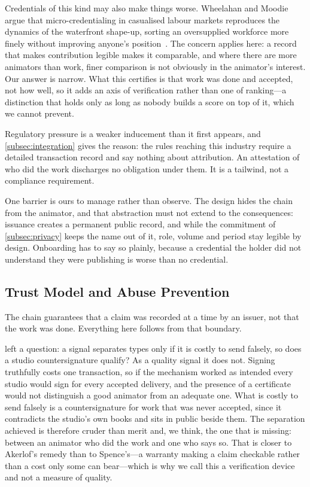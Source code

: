 Credentials of this kind may also make things worse. Wheelahan and Moodie argue that
micro-credentialing in casualised labour markets reproduces the dynamics of the
waterfront shape-up, sorting an oversupplied workforce more finely without improving
anyone's position~\cite{wheelahan2021gig}. The concern applies here: a record that makes
contribution legible makes it comparable, and where there are more animators than work,
finer comparison is not obviously in the animator's interest. Our answer is narrow. What
this certifies is that work was done and accepted, not how well, so it adds an axis of
verification rather than one of ranking---a distinction that holds only as long as
nobody builds a score on top of it, which we cannot prevent.

Regulatory pressure is a weaker inducement than it first appears, and
\cref{subsec:integration} gives the reason: the rules reaching this industry require a
detailed transaction record and say nothing about attribution. An attestation of who
did the work discharges no obligation under them. It is a tailwind, not a compliance
requirement.

One barrier is ours to manage rather than observe. The design hides the chain from the
animator, and that abstraction must not extend to the consequences: issuance creates a
permanent public record, and while the commitment of \cref{subsec:privacy} keeps the name
out of it, role, volume and period stay legible by design. Onboarding has to say so
plainly, because a credential the holder did not understand they were publishing is worse
than no credential.

\subsection{Trust Model and Abuse Prevention}
\label{subsec:trust}

The chain guarantees that a claim was recorded at a time by an issuer, not that the
work was done. Everything here follows from that boundary.

 left a question: a signal separates types only if it is costly to
send falsely, so does a studio countersignature qualify? As a quality signal it does
not. Signing truthfully costs one transaction, so if the mechanism worked as intended
every studio would sign for every accepted delivery, and the presence of a certificate
would not distinguish a good animator from an adequate one. What is costly to send
falsely is a countersignature for work that was never accepted, since it contradicts the
studio's own books and sits in public beside them. The separation achieved is therefore
cruder than merit and, we think, the one that is missing: between an animator who did the
work and one who says so. That is closer to Akerlof's remedy than to Spence's---a
warranty making a claim checkable rather than a cost only some can bear---which is why we
call this a verification device and not a measure of quality.

